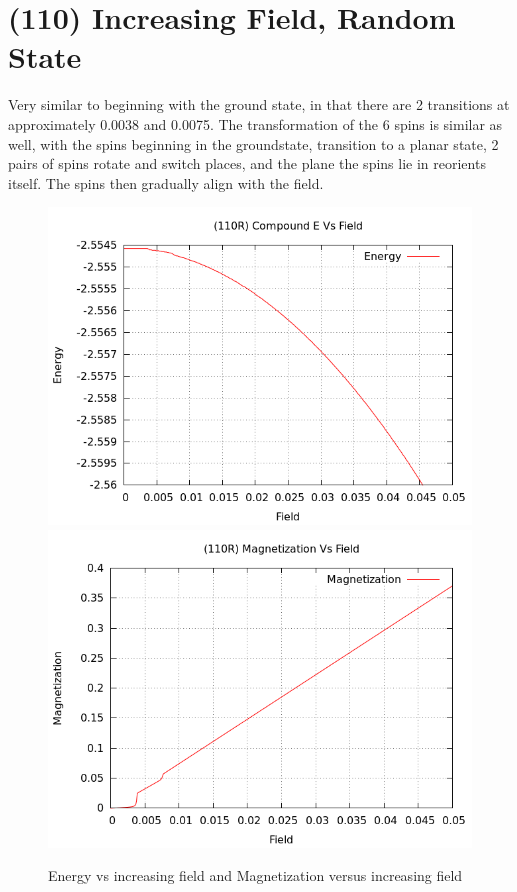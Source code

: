 \documentclass{article}
\begin{document}
\section{(110) Increasing Field, Random State}
Very similar to beginning with the ground state, in that there are 2 transitions at approximately 0.0038 and 0.0075. The transformation of the 
6 spins is similar as well,
with the spins beginning in the groundstate, transition to a planar state, 2 pairs of spins rotate and switch places,
and the plane the spins lie in reorients itself. The spins then gradually align with the field.
\begin{figure}[ht]
 \centering 
\includegraphics[scale=0.3]{HVariedData/Increasing/110EIncR.png}
\includegraphics[scale=0.3]{HVariedData/Increasing/110MincR.png}
\caption{Energy vs increasing field and Magnetization versus increasing field}
\end{figure}
\end{document}
